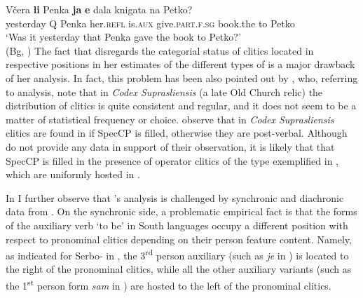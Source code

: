 \documentclass[output=paper,modfonts,newtxmath,hidelinks]{langscibook}
\begin{document}
\ea \label{11:ex10}
	\gll Včera \textbf{li} Penka \textbf{ja} \textbf{e}  dala knigata na Petko?\\
     	 yesterday Q Penka her.\textsc{refl} is\textsubscript{}.\textsc{aux} give.\textsc{part.f.sg} book.the to Petko \\
	\glt `Was it yesterday that Penka gave the book to Petko?'\\{}\hfill (Bg, \citealt[833]{tomic1996})
\z
The fact that \citet{pancheva2005} disregards the categorial status of clitics located in respective positions in her estimates of the different types of  is a major drawback of her analysis. In fact, this problem has been also pointed out by \citet{dimitrovavulchanova-vulchanov2008}, who, referring to  analysis, note that in \textit{Codex Suprasliensis} (a late Old Church  relic) the distribution of clitics is quite consistent and regular, and it does not seem to be a matter of statistical frequency or choice. \citeauthor{dimitrovavulchanova-vulchanov2008} observe that in \textit{Codex Suprasliensis} clitics are found in  if SpecCP is filled, otherwise they are post-verbal. Although \citeauthor{dimitrovavulchanova-vulchanov2008} do not provide any data in support of their observation, it is likely that that SpecCP is filled in the presence of operator clitics of the type exemplified in , which are uniformly hosted in . 

In \citet{migdalski2016} I further observe that \citeauthor{pancheva2005}’s analysis is challenged by synchronic and diachronic  data from . On the synchronic side, a problematic empirical fact is that the  forms of the auxiliary verb ‘to be’ in South  languages occupy a different position with respect to pronominal clitics depending on their person feature content. Namely, as indicated for Serbo- in , the 3\textsuperscript{rd} person auxiliary  (such as \textit{je} in ) is located to the right of the pronominal clitics, while all the other auxiliary variants (such as the 1\textsuperscript{st} person form \textit{sam} in ) are hosted to the left of the pronominal clitics. 
\end{document}
